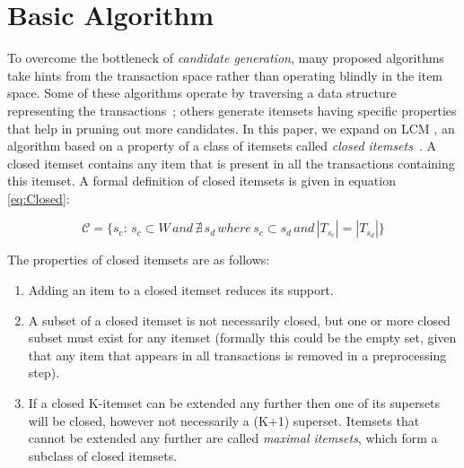 \documentclass{sig-alternate}
\begin{document}
\section{Basic Algorithm}
\label{sec:lcm}
To overcome the bottleneck of \emph{candidate generation}, many proposed
algorithms take hints from the transaction space rather than operating blindly
in the item space.
Some of these algorithms operate by traversing a data structure representing
the transactions~\cite{han2000mining}; others generate itemsets having
specific properties that help in pruning out more candidates.
In this paper, we expand on LCM \cite{uno2004lcm}, an algorithm based on a
property of a class of itemsets called
\emph{closed itemsets}~\cite{pasquier1999discovering}.
A closed itemset contains any item that is present in all the transactions
containing this itemset.
A formal definition of closed itemsets is given in equation \ref{eq:Closed}: 

\begin{equation}\label{eq:Closed}\mathcal{C} = \{s_c:\, s_c \subset W \, and \,\nexists \, s_d \, where \, s_c  \subset s_d \, and \, |T_{s_c}| = |T_{s_d}|\}\end{equation}

The properties of closed itemsets are as follows:
\begin{enumerate}
\item Adding an item to a closed itemset reduces its support. 
\item A subset of a closed itemset is not necessarily closed, but one or more closed subset must exist for any itemset (formally this could be the empty set, given that any item that appears in all transactions is removed in a preprocessing step). 
\item If a closed K-itemset can be extended any further then one of its supersets will be closed, however not necessarily a (K+1) superset. Itemsets that cannot be extended any further are called \emph{maximal itemsets}, which form a subclass of closed itemsets.
\end{enumerate}
\end{document}
